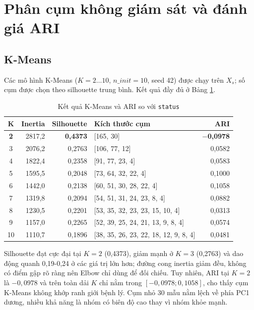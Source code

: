 \section{Phân cụm không giám sát và đánh giá ARI}

\subsection{K-Means}
Các mô hình K-Means ($K = 2\dots10$, $n\_init=10$, seed 42) được chạy trên $X_s$; số cụm
được chọn theo silhouette trung bình. Kết quả đầy đủ ở Bảng \ref{tab:kmeans}.

\begin{table}[H]
\centering
\caption{Kết quả K-Means và ARI so với \texttt{status}}
\begin{tabular}{|c|r|r|l|r|}
\hline
\textbf{K} & \textbf{Inertia} & \textbf{Silhouette} & \textbf{Kích thước cụm} & \textbf{ARI} \\
\hline
\textbf{2} & 2817,2 & \textbf{0,4373} & [165, 30] & \textbf{$-$0,0978} \\
\hline
3 & 2076,2 & 0,2763 & [106, 77, 12] & 0,0582 \\
\hline
4 & 1822,4 & 0,2358 & [91, 77, 23, 4] & 0,0583 \\
\hline
5 & 1595,5 & 0,2048 & [73, 64, 32, 22, 4] & 0,1000 \\
\hline
6 & 1442,0 & 0,2138 & [60, 51, 30, 28, 22, 4] & 0,1058 \\
\hline
7 & 1319,8 & 0,2094 & [54, 51, 31, 24, 23, 8, 4] & 0,0882 \\
\hline
8 & 1230,5 & 0,2201 & [53, 35, 32, 23, 23, 15, 10, 4] & 0,0313 \\
\hline
9 & 1157,0 & 0,2265 & [52, 39, 25, 24, 21, 13, 9, 8, 4] & 0,0574 \\
\hline
10 & 1110,7 & 0,1896 & [38, 35, 26, 23, 22, 18, 12, 9, 8, 4] & 0,0481 \\
\hline
\end{tabular}
\label{tab:kmeans}
\end{table}

Silhouette đạt cực đại tại $K = 2$ (0,4373), giảm mạnh ở $K = 3$ (0,2763) và dao động quanh
0,19-0,24 ở các giá trị lớn hơn; đường cong inertia giảm đều, không có điểm gập rõ ràng nên
Elbow chỉ dùng để đối chiếu. Tuy nhiên, ARI tại $K = 2$ là $-0{,}0978$ và trên toàn dải
$K$ chỉ nằm trong $[-0{,}0978; 0{,}1058]$, cho thấy cụm K-Means không khớp ranh giới bệnh
lý. Cụm nhỏ 30 mẫu nằm lệch về phía PC1 dương, nhiều khả năng là nhóm có biên độ cao
thay vì nhóm khỏe mạnh.

